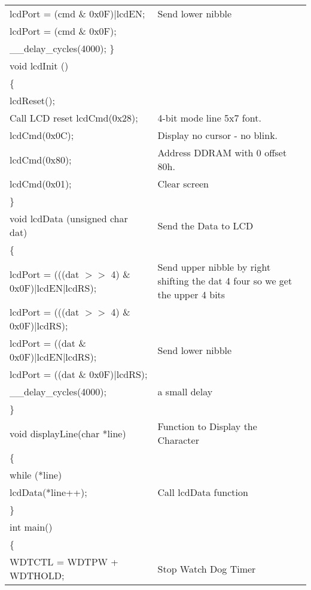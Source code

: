 \documentclass[12pt, letterpaper]{article}
\newcommand\tab[1][1cm]{\hspace*{#1}}
\begin{document}
\begin{longtable}{|p{6cm}||p{5cm}|}
       
        \tab lcdPort = (cmd \& 0x0F)|lcdEN; & Send lower nibble \\
        \tab lcdPort = (cmd \& 0x0F); & \\

        \tab \_\_delay\_cycles(4000);
\} & \\

void lcdInit () & \\
\{ & \\
        \tab lcdReset(); & \\Call LCD reset
        \tab lcdCmd(0x28);   &     4-bit mode \- 2 line \- 5x7 font.\\
        \tab lcdCmd(0x0C);   &     Display no cursor - no blink. \\
        \tab lcdCmd(0x80);   &     Address DDRAM with 0 offset 80h.\\
        \tab lcdCmd(0x01);   &     Clear screen \\
\} & \\


void lcdData (unsigned char dat) & Send the Data to LCD\\
\{ & \\
       
       \tab lcdPort = (((dat $>>$ 4) \& 0x0F)|lcdEN|lcdRS); & Send upper nibble by right shifting the dat 4 four so we get the upper 4 bits\\
       \tab lcdPort = (((dat $>>$ 4) \& 0x0F)|lcdRS); & \\

        
       \tab lcdPort = ((dat \& 0x0F)|lcdEN|lcdRS); & Send lower nibble\\
       \tab lcdPort = ((dat \& 0x0F)|lcdRS); & \\

        \tab \_\_delay\_cycles(4000); &  a small delay \\
\} & \\

void displayLine(char *line) & Function to Display the Character \\
\{ & \\
        \tab while (*line) & \\
         \tab \tab lcdData(*line++); & Call lcdData function\\
\} & \\

int main() & \\
\{ & \\
        
        \tab WDTCTL = WDTPW + WDTHOLD; & Stop Watch Dog Timer\\


\end{longtable}
\end{document}
